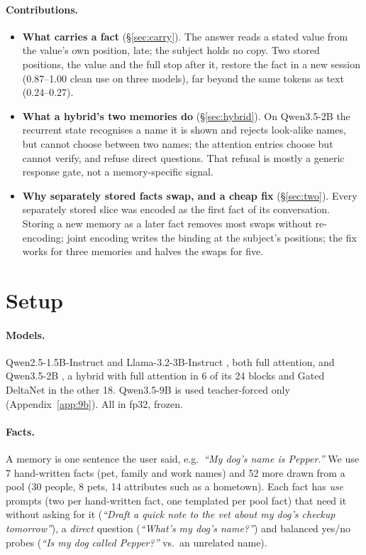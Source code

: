 \documentclass[11pt]{article}
\begin{document}
\paragraph{Contributions.}
\begin{itemize}\setlength\itemsep{0pt}
\item \textbf{What carries a fact} (\S\ref{sec:carry}). The answer reads a stated value from the value's own position,
late; the subject holds no copy. Two stored positions, the value and the full stop after it, restore the fact in a
new session (0.87--1.00 clean use on three models), far beyond the same tokens as text (0.24--0.27).
\item \textbf{What a hybrid's two memories do} (\S\ref{sec:hybrid}). On Qwen3.5-2B the recurrent state recognises a
name it is shown and rejects look-alike names, but cannot choose between two names; the attention entries choose but
cannot verify, and refuse direct questions. That refusal is mostly a generic response gate, not a memory-specific
signal.
\item \textbf{Why separately stored facts swap, and a cheap fix} (\S\ref{sec:two}). Every separately stored slice was
encoded as the first fact of its conversation. Storing a new memory as a later fact removes most swaps without
re-encoding; joint encoding writes the binding at the subject's positions; the fix works for three memories and halves
the swaps for five.
\end{itemize}

\section{Setup}
\label{sec:setup}

\paragraph{Models.} Qwen2.5-1.5B-Instruct \citep{qwen2024qwen25} and Llama-3.2-3B-Instruct \citep{grattafiori2024llama3},
both full attention, and Qwen3.5-2B \citep{qwen2026omni}, a hybrid with full attention in 6 of its 24 blocks and Gated
DeltaNet \citep{yang2025gdn} in the other 18. Qwen3.5-9B is used teacher-forced only (Appendix~\ref{app:9b}). All in
fp32, frozen.

\paragraph{Facts.} A memory is one sentence the user said, e.g.\ \textit{``My dog's name is Pepper.''} We use 7
hand-written facts (pet, family and work names) and 52 more drawn from a pool (30 people, 8 pets, 14 attributes such as
a hometown). Each fact has \emph{use} prompts (two per hand-written fact, one templated per pool fact) that need it without asking for it (\textit{``Draft a quick note to the vet about my dog's checkup tomorrow''}), a \emph{direct} question (\textit{``What's my dog's name?''}) and balanced
yes/no probes (\textit{``Is my dog called Pepper?''} vs.\ an unrelated name).
\end{document}
